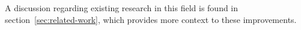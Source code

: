 A discussion regarding existing research in this field is found in section~\ref{sec:related-work}, which provides more context to these improvements.

